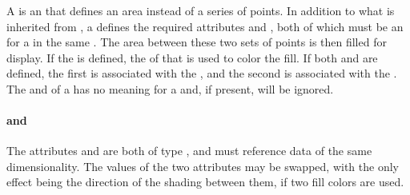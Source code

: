 \begin{blockChanged}
\subsubsection{}
\label{class:shadedArea}
A \ShadedArea is an \AbstractCurve that defines an area instead of a series of points.  In addition to what is inherited from \AbstractCurve, a \ShadedArea defines the required attributes  and , both of which must be an \SIdRef for a \DataGenerator in the same \SedDocument.  The area between these two sets of points is then filled for display.  If the  is defined, the \Fill of that \Style is used to color the fill.  If both  and  are defined, the first is associated with the , and the second is associated with the . The \Marker and \Line of a \Style has no meaning for a \ShadedArea and, if present, will be ignored.

\paragraph*{ and }
The attributes  and  are both of type \SIdRef, and must reference data of the same dimensionality.  The values of the two attributes may be swapped, with the only effect being the direction of the shading between them, if two fill colors are used.

\end{blockChanged}



